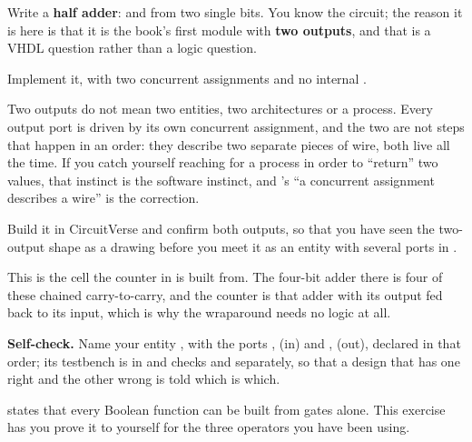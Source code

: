 \label{c1:ex:half_adder}
Write a \textbf{half adder}:  and  from two single bits. You know the
circuit; the reason it is here is that it is the book's first module with \textbf{two outputs}, and
that is a VHDL question rather than a logic question.

 Implement it, with two concurrent assignments and no internal .

Two outputs do not mean two entities, two architectures or a process. Every output port is driven
by its own concurrent assignment, and the two are not steps that happen in an order: they describe
two separate pieces of wire, both live all the time. If you catch yourself reaching for a process
in order to ``return'' two values, that instinct is the software instinct, and
's ``a concurrent assignment describes a wire'' is the correction.

 Build it in CircuitVerse and confirm both outputs, so that you have seen the two-output
shape as a drawing before you meet it as an entity with several  ports in
.

This is the cell the counter in  is built from. The four-bit
adder there is four of these chained carry-to-carry, and the counter is that adder with its output
fed back to its input, which is why the wraparound needs no logic at all.


\begin{selfcheck}
\textbf{Self-check.} Name your entity , with the ports ,  (in) and
,  (out), declared in that order; its testbench is in
 and checks  and  separately, so that a design
that has one right and the other wrong is told which is which.
\end{selfcheck}


\label{c1:ex:nand}
 states that every Boolean function can be built from  gates
alone. This exercise has you prove it to yourself for the three operators you have been using.

